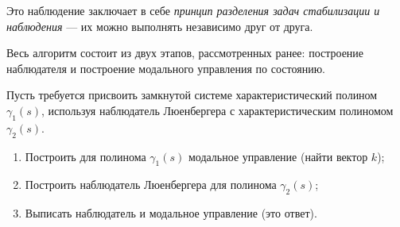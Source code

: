 \documentclass[../../TAU.tex]{subfiles}
\begin{document}
    Это наблюдение заключает в себе {\it принцип разделения задач стабилизации и наблюдения} --- их можно выполнять независимо друг от друга.

    Весь алгоритм состоит из двух этапов, рассмотренных ранее: построение наблюдателя и построение модального управления по состоянию.

    Пусть требуется присвоить замкнутой системе характеристический полином $\gamma_1(s)$, используя наблюдатель Люенбергера с характеристическим полиномом $\gamma_2(s)$.

    \begin{enumerate}
        \item Построить для полинома $\gamma_1(s)$ модальное управление (найти вектор $k$);
        \item Построить наблюдатель Люенбергера для полинома $\gamma_2(s)$;
        \item Выписать наблюдатель и модальное управление  (это ответ).
    \end{enumerate}
\end{document}
